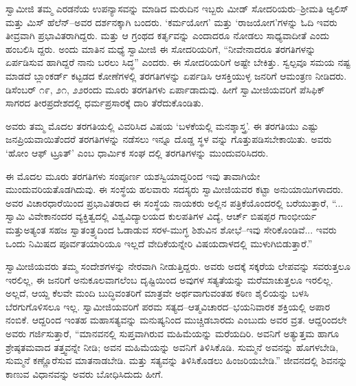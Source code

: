 ಸ್ವಾಮೀಜಿ ತಮ್ಮ ಎರಡನೆಯ ಉಪನ್ಯಾಸವನ್ನು ಮಾಡಿದ ಮರುದಿನ ಇಬ್ಬರು ಮೀಡ್ ಸೋದರಿಯರು–ಶ್ರೀಮತಿ ಆ್ಯಲಿಸ್ ಮತ್ತು ಮಿಸ್ ಹೆಲೆನ್​–ಅವರ ದರ್ಶನಕ್ಕಾಗಿ ಬಂದರು. ‘ಕರ್ಮಯೋಗ’ ಮತ್ತು ‘ರಾಜಯೋಗ’ಗಳನ್ನು ಓದಿ ಇವರು ತೀವ್ರವಾಗಿ ಪ್ರಭಾವಿತರಾಗಿದ್ದರು. ಮತ್ತು ಆ ಗ್ರಂಥದ ಕರ್ತೃವನ್ನು ಎಂದಾದರೂ ನೋಡಲು ಸಾಧ್ಯವಾದೀತೆ ಎಂದು ಹಂಬಲಿಸಿ ದ್ದರು. ಅಂದು ಮಾತಿನ ಮಧ್ಯೆ ಸ್ವಾಮೀಜಿ ಈ ಸೋದರಿಯರಿಗೆ, “ನೀವೇನಾದರೂ ತರಗತಿಗಳನ್ನು ಏರ್ಪಡಿಸುವ ಹಾಗಿದ್ದರೆ ನಾನು ಬರಲು ಸಿದ್ಧ” ಎಂದರು. ಈ ಸೋದರಿಯರಿಗೆ ಅಷ್ಟೇ ಬೇಕಿತ್ತು. ಸ್ವಲ್ಪವೂ ಸಮಯ ನಷ್ಟ ಮಾಡದೆ ಬ್ಲಾಂಕರ್ಡ್ ಕಟ್ಟಡದ ಕೋಣೆಗಳಲ್ಲಿ ತರಗತಿಗಳನ್ನು ಏರ್ಪಡಿಸಿ ಆಸಕ್ತಿಯುಳ್ಳ ಜನರಿಗೆ ಆಮಂತ್ರಣ ನೀಡಿದರು. ಡಿಸೆಂಬರ್ ೧೯, ೨೧, ೨೨ರಂದು ಮೂರು ತರಗತಿಗಳು ಏರ್ಪಾಡಾದುವು. ಹೀಗೆ ಸ್ವಾಮೀಜಿಯವರಿಗೆ ಪೆಸಿಫಿಕ್ ಸಾಗರದ ತೀರಪ್ರದೇಶದಲ್ಲಿ ಧರ್ಮಪ್ರಸಾರಕ್ಕೆ ದಾರಿ ತೆರೆದುಕೊಂಡಿತು.

ಅವರು ತಮ್ಮ ಮೊದಲ ತರಗತಿಯಲ್ಲಿ ವಿವರಿಸಿದ ವಿಷಯ ‘ಬಳಕೆಯಲ್ಲಿ ಮನಶ್ಶಾಸ್ತ್ರ’. ಈ ತರಗತಿಯು ಎಷ್ಟು ಜನಪ್ರಿಯವಾಯಿತೆಂದರೆ ತರಗತಿಗಳನ್ನು ನಡೆಸಲು ಇನ್ನೂ ದೊಡ್ಡ ಸ್ಥಳ ವನ್ನು ಗೊತ್ತುಪಡಿಸಬೇಕಾಯಿತು. ಅವರು ‘ಹೋಂ ಆಫ್ ಟ್ರೂತ್​’ ಎಂಬ ಧಾರ್ಮಿಕ ಸಂಘ ದಲ್ಲಿ ತರಗತಿಗಳನ್ನು ಮುಂದುವರಿಸಿದರು.

ಈ ಮೊದಲ ಮೂರು ತರಗತಿಗಳು ಸಂಪೂರ್ಣ ಯಶಸ್ವಿಯಾದ್ದರಿಂದ ಇವು ತಾವಾಗಿಯೇ ಮುಂದುವರಿಯತೊಡಗಿದುವು. ಈ ಸಂಸ್ಥೆಯ ಹಲವಾರು ಸದಸ್ಯರು ಸ್ವಾಮೀಜಿಯವರ ಕಟ್ಟಾ ಅನುಯಾಯಿಗಳಾದರು. ಅವರ ವಿಚಾರಧಾರೆಯಿಂದ ಪ್ರಭಾವಿತರಾದ ಈ ಸಂಸ್ಥೆಯ ನಾಯಕರು ಅಲ್ಲಿನ ಪತ್ರಿಕೆಯೊಂದರಲ್ಲಿ ಬರೆಯುತ್ತಾರೆ, “... ಸ್ವಾಮಿ ವಿವೇಕಾನಂದರ ವ್ಯಕ್ತಿತ್ವದಲ್ಲಿ ವಿಶ್ವವಿದ್ಯಾಲಯದ ಕುಲಪತಿಗಳ ವಿದ್ಯೆ, ಆರ್ಚ್ ಬಿಷಪ್ಪರ ಗಾಂಭೀರ್ಯ ಮತ್ತುಅತ್ಯಂತ ಸಹಜ ಸ್ವಾತಂತ್ರ್ಯದಿಂದ ಓಡಾಡುವ ಸರಳ-ಮುಗ್ಧ ಶಿಶುವಿನ ಶೋಭೆ–ಇವು ಸೇರಿಕೊಂಡಿವೆ... ಇವರು ಒಂದು ನಿಮಿಷದ ಪೂರ್ವತಯಾರಿಯೂ ಇಲ್ಲದೆ ವೇದಿಕೆಯನ್ನೇರಿ ವಿಷಯದಾಳದಲ್ಲಿ ಮುಳುಗಿಬಿಡುತ್ತಾರೆ.”

ಸ್ವಾಮೀಜಿಯವರು ತಮ್ಮ ಸಂದೇಶಗಳನ್ನು ನೇರವಾಗಿ ನೀಡುತ್ತಿದ್ದರು. ಅವರು ಅದಕ್ಕೆ ಸಕ್ಕರೆಯ ಲೇಪವನ್ನು ಸವರುತ್ತಲೂ ಇರಲಿಲ್ಲ, ಈ ಜನರಿಗೆ ಅನುಕೂಲವಾಗಲೆಂಬ ದೃಷ್ಟಿಯಿಂದ ಅವುಗಳ ಸತ್ಯತೆಯನ್ನು ಮರೆಮಾಚುತ್ತಲೂ ಇರಲಿಲ್ಲ. ಅಲ್ಲದೆ, ಆಯ್ದ ಕೆಲವೇ ಮಂದಿ ಬುದ್ಧಿವಂತರಿಗೆ ಮಾತ್ರವೇ ಅರ್ಥವಾಗುವಂತಹ ಕಠಿಣ ಶೈಲಿಯನ್ನು ಬಳಸಿ ಬೆರಗುಗೊಳಿಸಲೂ ಇಲ್ಲ. ಸ್ವಾಮೀಜಿಯವರಿಗೆ ಪರಮ ಸತ್ಯದ–ಆತ್ಮವಿಚಾರದ–ಭಯನಿವಾರಕ ಶಕ್ತಿಯಲ್ಲಿ ಅಪಾರ ನಂಬಿಕೆ. ಆದ್ದರಿಂದ ಇಂತಹ ಮಹಾಸತ್ಯವನ್ನು ಮನುಷ್ಯನಿಂದ ಮುಚ್ಚಿಡಬಾರದು ಎಂಬುದು ಅವರ ವ್ರತ. ಆದ್ದರಿಂದಲೇ ಅವರು ಗರ್ಜಿಸುತ್ತಾರೆ, “ಮಾನವನಲ್ಲಿ ಸುಪ್ತವಾಗಿರುವ ಮಹಿಮೆಯನ್ನು ಮರೆಯದಿರಿ. ಅವನಿಗೆ ಅತ್ಯುತ್ತಮ ಹಾಗೂ ಶ್ರೇಷ್ಠತಮವಾದ ತತ್ತ್ವವನ್ನೇ ನೀಡಿ; ಅವನ ಮಹಿಮೆಯನ್ನು ಅವನಿಗೆ ತಿಳಿಸಿಕೊಡಿ. ಸುಮ್ಮನೆ ಅವನನ್ನು ಹೊಗಳಬೇಡಿ, ಸುಮ್ಮನೆ ಕಣ್ಣೊರೆಸುವ ಮಾತನಾಡಬೇಡಿ. ಮತ್ತು ಸತ್ಯವನ್ನು ತಿಳಿಸಿಕೊಡಲು ಹಿಂಜರಿಯಬೇಡಿ.” ಜೀವನದಲ್ಲಿ ಶಿವನನ್ನು ಕಾಣುವ ವಿಧಾನವನ್ನು ಅವರು ಬೋಧಿಸಿದುದು ಹೀಗೆ.

